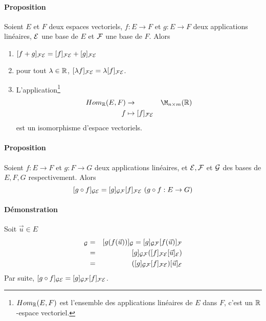 \paragraph{Proposition} Soient $E$ et $F$ deux espaces vectoriels, $f: E \rightarrow F$ et $g: E \rightarrow F$ deux applications linéaires, $\mathcal{E}$ une base de $E$ et $\mathcal{F}$ une base de $F$. Alors
\begin{enumerate}
  \item $[f+ g]_{\mathcal{F} \mathcal{E}} = [f]_{\mathcal{F} \mathcal{E}} + [g]_{\mathcal{F} \mathcal{E}}$
  \item pour tout $\lambda \in \mathbb{R}$, $[\lambda f]_{\mathcal{F} \mathcal{E}} = \lambda [f]_{\mathcal{F} \mathcal{E}}$.
  \item L'application\footnote{$Hom_{\mathbb{R}}(E, F)$ est l'ensemble des applications linéaires de $E$ dans $F$, c'est un $\mathbb{R}$-espace vectoriel.}
    \begin{eqnarray*}
      Hom_\R(E, F) &\rightarrow& \M_{n\times m}(\R) \\
      f &\mapsto [f]_{\cF \cE}
    \end{eqnarray*}
    est un isomorphisme d'espace vectoriels.
\end{enumerate}

\paragraph{Proposition} Soient $f: E \rightarrow F$ et $g: F \rightarrow G$ deux applications linéaires, et $\mathcal{E}, \mathcal{F}$ et $\mathcal{G}$ des bases de $E, F, G$ respectivement. Alors
$$[g \circ f]_{\mathcal{G} \mathcal{E}} = [g]_{\mathcal{G} \mathcal{F}} [f]_{\mathcal{F} \mathcal{E}} ~ (g \circ f: E \rightarrow G)$$

\paragraph{Démonstration} Soit $\vec{u} \in E$
\begin{eqnarray*}
  [(g \circ f)(\vec{u})]_{\cG} &=& [g(f(\vec{u}))]_{\cG} = [g]_{\cG \cF} [f(\vec{u})]_{\cF} \\
    &=& [g]_{\cG \cF} ([f]_{\cF \cE} [\vec{u}]_{\cE}) \\
    &=& ([g]_{\cG \cF} [f]_{\cF \cE}) [\vec{u}]_{\cE} 
\end{eqnarray*}
Par suite, $[g \circ f]_{\mathcal{G} \mathcal{E}} = [g]_{\mathcal{G} \mathcal{F}} [f]_{\mathcal{F} \mathcal{E}}$.

